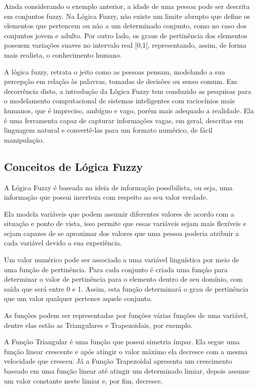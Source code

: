 \documentclass[
	article,			%
	11pt,				%
	oneside,			%
	a4paper,			%
	english,			%
	brazil,				%
	sumario=tradicional
	]{abntex2}
\begin{document}
\begin{multicols}{2}
Ainda considerando o exemplo anterior, a idade de uma pessoa pode ser descrita em conjuntos fuzzy. Na Lógica Fuzzy, não existe um limite abrupto que define os elementos que pertencem ou não a um determinado conjunto, como no caso dos conjuntos jovem e adulto. Por outro lado, os graus de pertinência dos elementos possuem variações suaves no intervalo real [0,1], representando, assim, de forma mais realista, o conhecimento humano. 

A lógica fuzzy, retrata o jeito como as pessoas pensam, modelando a sua percepção em relação às palavras, tomadas de decisões ou senso comum. Em decorrência disto, a introdução da Lógica Fuzzy tem conduzido as pesquisas para o modelamento computacional de sistemas inteligentes com raciocínios mais humanos, que é impreciso, ambíguo e vago, porém mais adequado a realidade. Ela é uma ferramenta capaz de capturar informações vagas, em geral, descritas em linguagem natural e convertê-las para um formato numérico, de fácil manipulação.


\subsection{Conceitos de Lógica Fuzzy}

A Lógica Fuzzy é baseada na ideia de informação possibilista, ou seja, uma informação que possui incerteza com respeito ao seu valor verdade.

Ela modela variáveis que podem assumir diferentes valores de acordo com a situação e ponto de vista, isso permite que essas variáveis sejam mais flexíveis e sejam capazes de se aproximar dos valores que uma pessoa poderia atribuir a cada variável devido a sua experiência.

Um valor numérico pode ser associado a uma variável linguística por meio de uma função de pertinência. Para cada conjunto é criada uma função para determinar o valor de pertinência para o elemento dentro de seu domínio, com saída que será entre 0 e 1. Assim, esta função determinará o grau de pertinência que um valor qualquer pertence aquele conjunto.

As funções podem ser representadas por funções várias funções de uma variável, dentre elas estão as Triangulares e Trapezoidais, por exemplo.

A Função Triangular é uma função que possui simetria ímpar. Ela segue uma função linear crescente e após atingir o valor máximo ela decresce com a mesma velocidade que cresceu. Já a Função Trapezoidal apresenta um crescimento baseado em uma função linear até atingir um determinado limiar, depois assume um valor constante neste limiar e, por fim, decresce.



\end{multicols}
\end{document}
